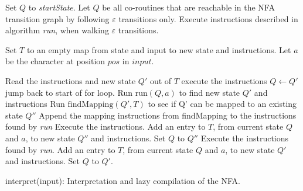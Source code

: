 \documentclass[11pt,a4paper,twoside,openright]{Thesis}
\theoremstyle{definition}
\begin{document}
\begin{algorithm*}[htpb]
\begin{algorithmic}[1]

\State Set $Q$ to \emph{startState}.
\State Let $Q$ be all co-routines that are reachable in the NFA transition graph by following $\varepsilon$ transitions only.
\State Execute instructions described in algorithm \emph{run}, when walking $\varepsilon$ transitions.

\State Set $T$ to an empty map from state and input to new state and instructions.
	\State Let $a$ be the character at position $pos$ in $input$.

		\State Read the instructions and new state $Q'$ out of $T$
		\State execute the instructions
		\State $Q\leftarrow Q'$
		\State jump back to start of for loop.
	\Else
		\State Run $\mbox{run}(Q,a)$ to find new state $Q'$ and instructions
		\State Run $\mbox{findMapping}(Q', T)$ to see if Q' can be mapped to an existing state $Q''$
    \State Append the mapping instructions from findMapping to the instructions found by \emph{run}\;
			\State Execute the instructions.
			\State Add an entry to $T$, from current state $Q$ and $a$, to new state $Q''$ and instructions.
			\State Set $Q$ to $Q''$
		\Else
      \State Execute the instructions found by \emph{run}.
			\State Add an entry to $T$, from current state $Q$ and $a$, to new state $Q'$ and instructions.
			\State Set $Q$ to $Q'$.
		\EndIf
	\EndIf
\EndFor
\end{algorithmic}
\caption{interpret(input): Interpretation and lazy compilation of the NFA.}
\label{interpret}
\end{algorithm*}
\end{document}
